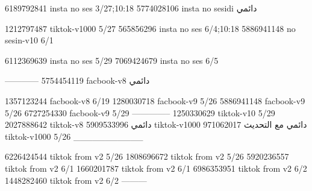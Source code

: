 
6189792841 insta no ses
3/27;10:18
5774028106 insta no sesidi
دائمي

1212797487 tiktok-v1000
5/27
565856296 insta no ses
6/4;10:18
5886941148 no sesin-v10
6/1

6112369639 insta no ses
5/29
7069424679 insta no ses
6/5

------------
5754454119 facbook-v8
دائمي

1357123244 facbook-v8
6/19
1280030718 facbook-v9
5/26
5886941148 facbook-v9
5/26
6727254330 facbook-v9
5/29
--------------
1250330629 tiktok-v10
5/29
2027888642 tiktok-v8
دائمي
5909533996 tiktok-v1000
دائمي مع التحديث
971062017 tiktok-v1000
5/26
___________

6226424544 tiktok from v2
5/26
1808696672 tiktok from v2
5/26
5920236557 tiktok from v2
6/1
1660201787 tiktok from v2
6/1
6986353951 tiktok from v2
6/2
1448282460 tiktok from v2
6/2
---------
